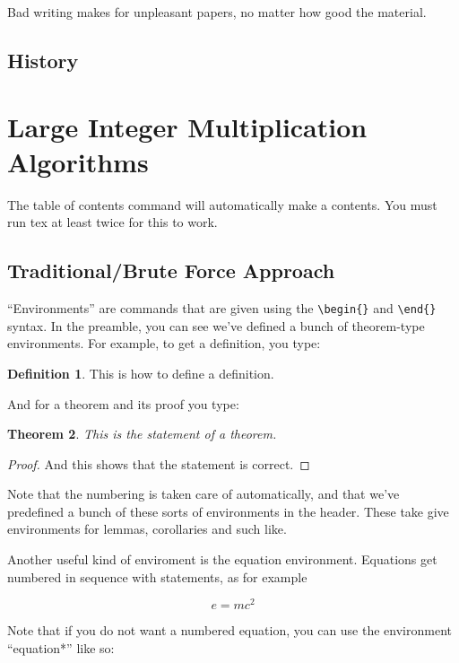 \documentclass[psamsfonts]{amsart}
\newtheorem{thm}{Theorem}[section]
\theoremstyle{definition}
\newtheorem{defn}[thm]{Definition}
\theoremstyle{remark}
\numberwithin{equation}{section}
\begin{document}
Bad writing makes for unpleasant papers, no matter how good the material.

\subsection{History}


\section{Large Integer Multiplication Algorithms}

The table of contents command will automatically make a contents.
You must run tex at least twice for this to work.

\subsection{Traditional/Brute Force Approach}

``Environments'' are commands that are given using the \verb|\begin{}|
  and \verb|\end{}| syntax. In the preamble, you can see we've defined
  a bunch of theorem-type environments.  For example, to get a definition, 
you type:

\begin{defn}  This is how to define a definition.
\end{defn}

And for a theorem and its proof you type:

\begin{thm}
This is the statement of a theorem.
\end{thm}
\begin{proof}
And this shows that the statement is correct.
\end{proof}

Note that the numbering is taken care of automatically, and that we've predefined a bunch of these sorts of environments in the header.  These take give environments for  lemmas, corollaries and such like. 

Another useful kind of enviroment is the equation environment.  Equations
get numbered in sequence with statements, as for example

\begin{equation}  e = mc^2
\end{equation}

Note that if you do not want a numbered equation, you can use the
environment ``equation*''
 like so:
\end{document}
